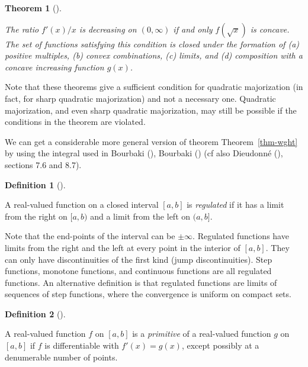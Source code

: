 \documentclass[
  12pt,
  letterpaper,
  DIV=11,
  numbers=noendperiod]{scrartcl}
\theoremstyle{plain}
\newtheorem{theorem}{Theorem}[section]
\theoremstyle{plain}
\theoremstyle{plain}
\theoremstyle{definition}
\newtheorem{definition}{Definition}[section]
\theoremstyle{remark}
\begin{document}
\begin{theorem}[]\protect\hypertarget{thm-sqrt}{}\label{thm-sqrt}

The ratio \(f'(x)/x\) is decreasing on \((0,\infty)\) if and only
\(f(\sqrt{x})\) is concave. The set of functions satisfying this
condition is closed under the formation of (a) positive multiples, (b)
convex combinations, (c) limits, and (d) composition with a concave
increasing function \(g(x)\).

\end{theorem}

Note that these theorems give a sufficient condition for quadratic
majorization (in fact, for sharp quadratic majorization) and not a
necessary one. Quadratic majorization, and even sharp quadratic
majorization, may still be possible if the conditions in the theorem are
violated.

We can get a considerable more general version of theorem
Theorem~\ref{thm-wght} by using the integral used in Bourbaki
(), Bourbaki
() (cf also Dieudonné
(), sections 7.6 and 8.7).

\begin{definition}[]\protect\hypertarget{def-regulated}{}\label{def-regulated}

A real-valued function on a closed interval \([a,b]\) is
\emph{regulated} if it has a limit from the right on \([a,b)\) and a
limit from the left on \((a,b]\).

\end{definition}

Note that the end-points of the interval can be \(\pm\infty\). Regulated
functions have limits from the right and the left at every point in the
interior of \([a,b]\). They can only have discontinuities of the first
kind (jump discontinuities). Step functions, monotone functions, and
continuous functions are all regulated functions. An alternative
definition is that regulated functions are limits of sequences of step
functions, where the convergence is uniform on compact sets.

\begin{definition}[]\protect\hypertarget{def-primitive}{}\label{def-primitive}

A real-valued function \(f\) on \([a,b]\) is a \emph{primitive} of a
real-valued function \(g\) on \([a,b]\) if \(f\) is differentiable with
\(f'(x)=g(x)\), except possibly at a denumerable number of points.

\end{definition}
\end{document}
